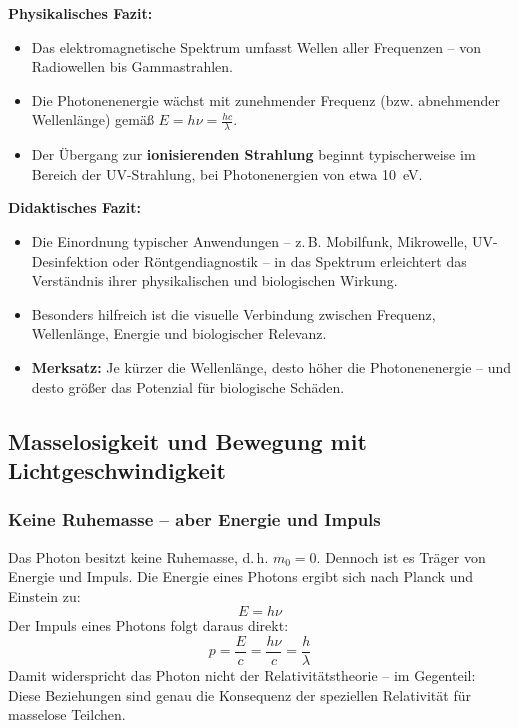 \begin{tcolorbox}[hinweisbox,title=Fazit zum elektromagnetischen Spektrum]
	\label{box:Fazit zum elektro}
	\textbf{Physikalisches Fazit:}
	
	\begin{itemize}
		\item Das elektromagnetische Spektrum umfasst Wellen aller Frequenzen – von Radiowellen bis Gammastrahlen.
		\item Die Photonenenergie wächst mit zunehmender Frequenz (bzw. abnehmender Wellenlänge) gemäß \(E = h \nu = \frac{hc}{\lambda}\).
		\item Der Übergang zur \textbf{ionisierenden Strahlung} beginnt typischerweise im Bereich der UV-Strahlung, bei Photonenergien von etwa \SI{10}{\electronvolt}.
	\end{itemize}
	
	\vspace{0.5em}
	\textbf{Didaktisches Fazit:}
	
	\begin{itemize}
		\item Die Einordnung typischer Anwendungen – z.\,B. Mobilfunk, Mikrowelle, UV-Desinfektion oder Röntgendiagnostik – in das Spektrum erleichtert das Verständnis ihrer physikalischen und biologischen Wirkung.
		\item Besonders hilfreich ist die visuelle Verbindung zwischen Frequenz, Wellenlänge, Energie und biologischer Relevanz.
		\item \textbf{Merksatz:} Je kürzer die Wellenlänge, desto höher die Photonenenergie – und desto größer das Potenzial für biologische Schäden.
	\end{itemize}
\end{tcolorbox}

\subsection{Masselosigkeit und Bewegung mit  Lichtgeschwindigkeit}

\subsubsection{Keine Ruhemasse -- aber Energie und Impuls}

Das Photon besitzt keine Ruhemasse, d.\,h. $m_0 = 0$. Dennoch ist es Tr\"ager von Energie und Impuls. Die Energie eines Photons ergibt sich nach Planck und Einstein zu:
\begin{equation}
	E = h \nu
\end{equation}
Der Impuls eines Photons folgt daraus direkt:
\begin{equation}
	p = \frac{E}{c} = \frac{h\nu}{c} = \frac{h}{\lambda}
\end{equation}
Damit widerspricht das Photon nicht der Relativit\"atstheorie -- im Gegenteil: Diese Beziehungen sind genau die Konsequenz der speziellen Relativit\"at f\"ur masselose Teilchen.

